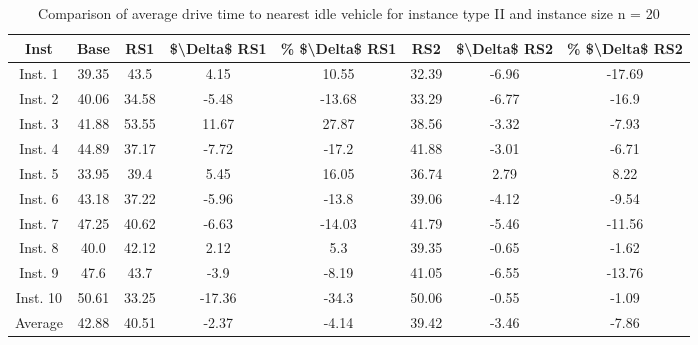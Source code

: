 \begin{table}[H]
\centering
\begin{tabular}{cccccccc}
  \hline
  \textbf{Inst} & \textbf{Base} & \textbf{RS1} & \textbf{\$\textbackslash{}Delta\$  RS1} & \textbf{\% \$\textbackslash{}Delta\$  RS1} & \textbf{RS2} & \textbf{\$\textbackslash{}Delta\$  RS2} & \textbf{\% \$\textbackslash{}Delta\$  RS2} \\\hline
  Inst. 1 & 39.35 & 43.5 & 4.15 & 10.55 & 32.39 & -6.96 & -17.69 \\
  Inst. 2 & 40.06 & 34.58 & -5.48 & -13.68 & 33.29 & -6.77 & -16.9 \\
  Inst. 3 & 41.88 & 53.55 & 11.67 & 27.87 & 38.56 & -3.32 & -7.93 \\
  Inst. 4 & 44.89 & 37.17 & -7.72 & -17.2 & 41.88 & -3.01 & -6.71 \\
  Inst. 5 & 33.95 & 39.4 & 5.45 & 16.05 & 36.74 & 2.79 & 8.22 \\
  Inst. 6 & 43.18 & 37.22 & -5.96 & -13.8 & 39.06 & -4.12 & -9.54 \\
  Inst. 7 & 47.25 & 40.62 & -6.63 & -14.03 & 41.79 & -5.46 & -11.56 \\
  Inst. 8 & 40.0 & 42.12 & 2.12 & 5.3 & 39.35 & -0.65 & -1.62 \\
  Inst. 9 & 47.6 & 43.7 & -3.9 & -8.19 & 41.05 & -6.55 & -13.76 \\
  Inst. 10 & 50.61 & 33.25 & -17.36 & -34.3 & 50.06 & -0.55 & -1.09 \\
  Average & 42.88 & 40.51 & -2.37 & -4.14 & 39.42 & -3.46 & -7.86 \\\hline
\end{tabular}
\caption{Comparison of average drive time to nearest idle vehicle for instance type II and instance size n = 20}
\label{tab:wait:resrelocation-nearest-drive-time-comparison_II_20}
\end{table}
